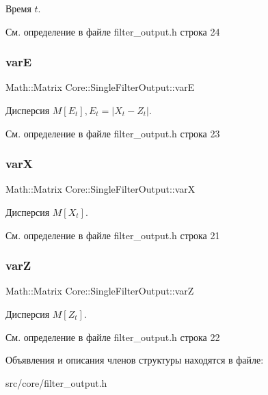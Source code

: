 Время $t$. 

См. определение в файле filter\+\_\+output.\+h строка 24

\hypertarget{struct_core_1_1_single_filter_output_ab89885f694006365cd0f8e4a1bbc6187}{}\label{struct_core_1_1_single_filter_output_ab89885f694006365cd0f8e4a1bbc6187} 
\subsubsection{\texorpdfstring{varE}{varE}}
{\footnotesize\ttfamily Math\+::\+Matrix Core\+::\+Single\+Filter\+Output\+::varE}

Дисперсия $M[E_t], E_t = |X_t - Z_t|$. 

См. определение в файле filter\+\_\+output.\+h строка 23

\hypertarget{struct_core_1_1_single_filter_output_a31a2094b47d89df8ffd1befdf43d1f6e}{}\label{struct_core_1_1_single_filter_output_a31a2094b47d89df8ffd1befdf43d1f6e} 
\subsubsection{\texorpdfstring{varX}{varX}}
{\footnotesize\ttfamily Math\+::\+Matrix Core\+::\+Single\+Filter\+Output\+::varX}

Дисперсия $M[X_t]$. 

См. определение в файле filter\+\_\+output.\+h строка 21

\hypertarget{struct_core_1_1_single_filter_output_aa0b4c0793c1277fe75e19fd96dc4cde4}{}\label{struct_core_1_1_single_filter_output_aa0b4c0793c1277fe75e19fd96dc4cde4} 
\subsubsection{\texorpdfstring{varZ}{varZ}}
{\footnotesize\ttfamily Math\+::\+Matrix Core\+::\+Single\+Filter\+Output\+::varZ}

Дисперсия $M[Z_t]$. 

См. определение в файле filter\+\_\+output.\+h строка 22



Объявления и описания членов структуры находятся в файле\+:\begin{DoxyCompactItemize}
\item 
src/core/filter\+\_\+output.\+h\end{DoxyCompactItemize}
